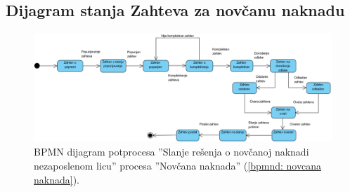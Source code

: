 \begin{mylandscape}
\subsection{Dijagram stanja Zahteva za nov\v canu naknadu}
	\begin{figure}[H]
		\centering
		\includegraphics[width=0.6\paperwidth]{dijagrami/dijagrami-stanja/novcana-naknada.png}
		\caption{BPMN dijagram potprocesa ''Slanje re\v senja o nov\v canoj naknadi nezaposlenom licu'' procesa ''Nov\v cana naknada'' (\ref{bpmnd: novcana naknada}).}
	\end{figure}
	
	
\end{mylandscape}

